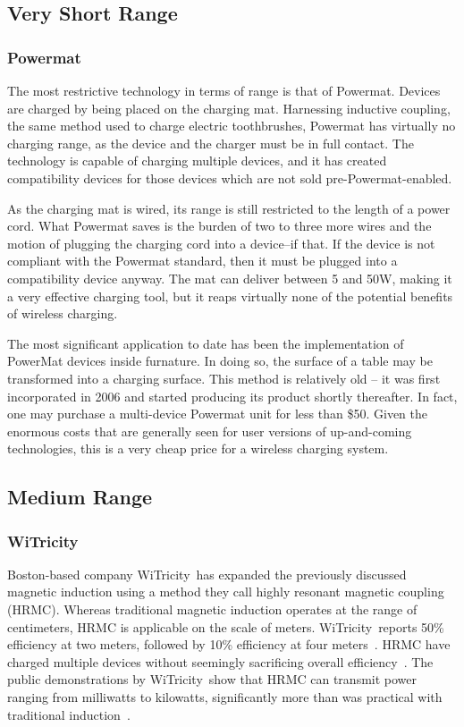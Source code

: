 \subsection{Very Short Range}
\subsubsection{Powermat}
The most restrictive technology in terms of range is that of Powermat. Devices are charged by being placed on the charging mat. Harnessing inductive coupling, the same method used to charge electric toothbrushes, Powermat has virtually no charging range, as the device and the charger must be in full contact. The technology is capable of charging multiple devices, and it has created compatibility devices for those devices which are not sold pre-Powermat-enabled.

As the charging mat is wired, its range is still restricted to the length of a power cord. What Powermat saves is the burden of two to three more wires and the motion of plugging the charging cord into a device--if that. If the device is not compliant with the Powermat standard, then it must be plugged into a compatibility device anyway.
The mat can deliver between 5 and 50W, making it a very effective charging tool, but it reaps virtually none of the potential benefits of wireless charging.

The most significant application to date has been the implementation of PowerMat devices inside furnature\cite{rogercheng205}. In doing so, the surface of a table may be transformed into a charging surface. This method is relatively old -- it was first incorporated in 2006  and started producing its product shortly thereafter. In fact, one may purchase a multi-device Powermat unit for less than \$50. Given the enormous costs that are generally seen for user versions of up-and-coming technologies, this is a very cheap price for a wireless charging system.

\subsection{Medium Range}

\subsubsection{WiTricity}
Boston-based company WiTricity\textregistered~has expanded the previously discussed magnetic induction using a method they call highly resonant magnetic coupling (HRMC). Whereas traditional magnetic induction operates at the range of centimeters, HRMC is applicable on the scale of meters. WiTricity\textregistered~reports 50\% efficiency at two meters, followed by 10\% efficiency at four meters~\cite{kesler_highly_2013,tucker_contribution_2013}. HRMC have charged multiple devices without seemingly sacrificing overall efficiency~\cite{kesler_highly_2013}. The public demonstrations by WiTricity\textregistered~show that HRMC can transmit power ranging from milliwatts to kilowatts, significantly more than was practical with traditional induction~\cite{kesler_highly_2013}.

